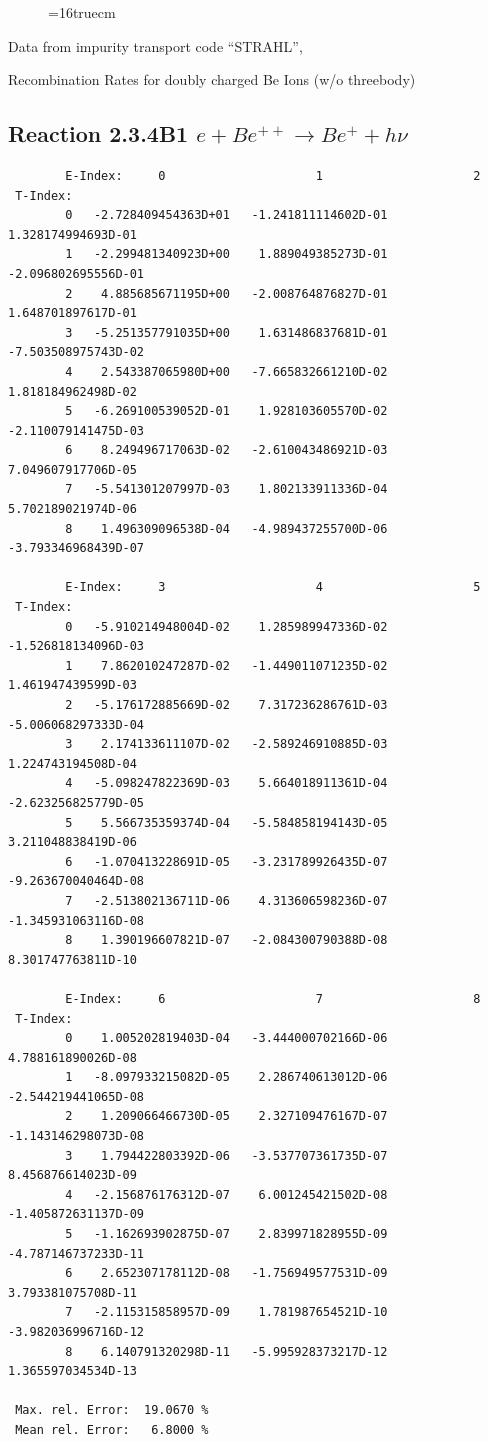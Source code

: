 \documentclass[12pt,dvips]{article}
\begin{document}
\begin{figure} \label{2.3.4B0}
\epsfxsize=16truecm
\end{figure}
\newpage
Data from impurity transport code ``STRAHL'', \cite{kn:Behringer}

  Recombination Rates for doubly charged Be Ions (w/o threebody)
\subsection{
Reaction 2.3.4B1  $e + Be^{++} \rightarrow Be^+ + h\nu$
}

\begin{small}\begin{verbatim}
        E-Index:     0                     1                     2
 T-Index:
        0   -2.728409454363D+01   -1.241811114602D-01    1.328174994693D-01
        1   -2.299481340923D+00    1.889049385273D-01   -2.096802695556D-01
        2    4.885685671195D+00   -2.008764876827D-01    1.648701897617D-01
        3   -5.251357791035D+00    1.631486837681D-01   -7.503508975743D-02
        4    2.543387065980D+00   -7.665832661210D-02    1.818184962498D-02
        5   -6.269100539052D-01    1.928103605570D-02   -2.110079141475D-03
        6    8.249496717063D-02   -2.610043486921D-03    7.049607917706D-05
        7   -5.541301207997D-03    1.802133911336D-04    5.702189021974D-06
        8    1.496309096538D-04   -4.989437255700D-06   -3.793346968439D-07

        E-Index:     3                     4                     5
 T-Index:
        0   -5.910214948004D-02    1.285989947336D-02   -1.526818134096D-03
        1    7.862010247287D-02   -1.449011071235D-02    1.461947439599D-03
        2   -5.176172885669D-02    7.317236286761D-03   -5.006068297333D-04
        3    2.174133611107D-02   -2.589246910885D-03    1.224743194508D-04
        4   -5.098247822369D-03    5.664018911361D-04   -2.623256825779D-05
        5    5.566735359374D-04   -5.584858194143D-05    3.211048838419D-06
        6   -1.070413228691D-05   -3.231789926435D-07   -9.263670040464D-08
        7   -2.513802136711D-06    4.313606598236D-07   -1.345931063116D-08
        8    1.390196607821D-07   -2.084300790388D-08    8.301747763811D-10

        E-Index:     6                     7                     8
 T-Index:
        0    1.005202819403D-04   -3.444000702166D-06    4.788161890026D-08
        1   -8.097933215082D-05    2.286740613012D-06   -2.544219441065D-08
        2    1.209066466730D-05    2.327109476167D-07   -1.143146298073D-08
        3    1.794422803392D-06   -3.537707361735D-07    8.456876614023D-09
        4   -2.156876176312D-07    6.001245421502D-08   -1.405872631137D-09
        5   -1.162693902875D-07    2.839971828955D-09   -4.787146737233D-11
        6    2.652307178112D-08   -1.756949577531D-09    3.793381075708D-11
        7   -2.115315858957D-09    1.781987654521D-10   -3.982036996716D-12
        8    6.140791320298D-11   -5.995928373217D-12    1.365597034534D-13

 Max. rel. Error:  19.0670 %
 Mean rel. Error:   6.8000 %


\end{verbatim}\end{small}
\end{document}
